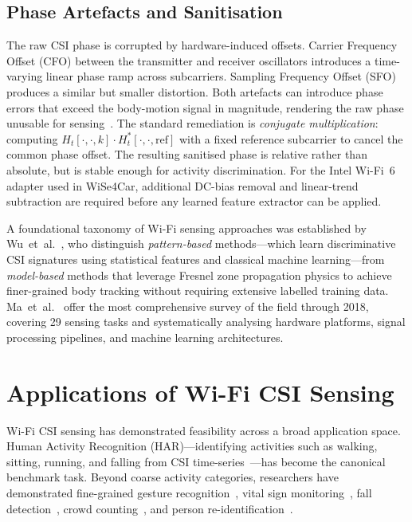 \documentclass[english,bibtex]{kththesis}
\begin{document}
\subsection{Phase Artefacts and Sanitisation}
\label{sec:csi-phase}

%
The raw CSI phase is corrupted by hardware-induced offsets. Carrier Frequency Offset (CFO) between the transmitter and receiver oscillators introduces a time-varying linear phase ramp across subcarriers. Sampling Frequency Offset (SFO) produces a similar but smaller distortion. Both artefacts can introduce phase errors that exceed the body-motion signal in magnitude, rendering the raw phase unusable for sensing~\cite{yousefi2017survey}. The standard remediation is \emph{conjugate multiplication}: computing \(H_t[\cdot,\cdot,k] \cdot H_t^{*}[\cdot,\cdot,\text{ref}]\) with a fixed reference subcarrier to cancel the common phase offset. The resulting sanitised phase is relative rather than absolute, but is stable enough for activity discrimination. For the Intel Wi-Fi~6 adapter used in WiSe4Car, additional DC-bias removal and linear-trend subtraction are required before any learned feature extractor can be applied.

A foundational taxonomy of Wi-Fi sensing approaches was established by Wu~et~al.~\cite{wu2017device}, who distinguish \emph{pattern-based} methods---which learn discriminative CSI signatures using statistical features and classical machine learning---from \emph{model-based} methods that leverage Fresnel zone propagation physics to achieve finer-grained body tracking without requiring extensive labelled training data. Ma~et~al.~\cite{ma2019wifi} offer the most comprehensive survey of the field through 2018, covering 29 sensing tasks and systematically analysing hardware platforms, signal processing pipelines, and machine learning architectures.

\section{Applications of Wi-Fi CSI Sensing}
\label{sec:applications}

Wi-Fi CSI sensing has demonstrated feasibility across a broad application space. Human Activity Recognition (HAR)---identifying activities such as walking, sitting, running, and falling from CSI time-series~\cite{yang2018device,wang2015understanding}---has become the canonical benchmark task. Beyond coarse activity categories, researchers have demonstrated fine-grained gesture recognition~\cite{yang2019learning,tan2022enabling,gu2022wigrunt}, vital sign monitoring~\cite{gu2019wifi}, fall detection~\cite{chu2023deep}, crowd counting~\cite{zou2017freecount}, and person re-identification~\cite{zou2018wifi}.
\end{document}
